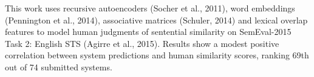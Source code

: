 This work uses recursive autoencoders (Socher et al., 2011), word embeddings (Pennington et al., 2014), associative matrices (Schuler, 2014) and lexical overlap features to model human judgments of sentential similarity on SemEval-2015 Task 2: English STS (Agirre et al., 2015). Results show a modest positive correlation between system predictions and human similarity scores, ranking 69th out of 74 submitted systems.
